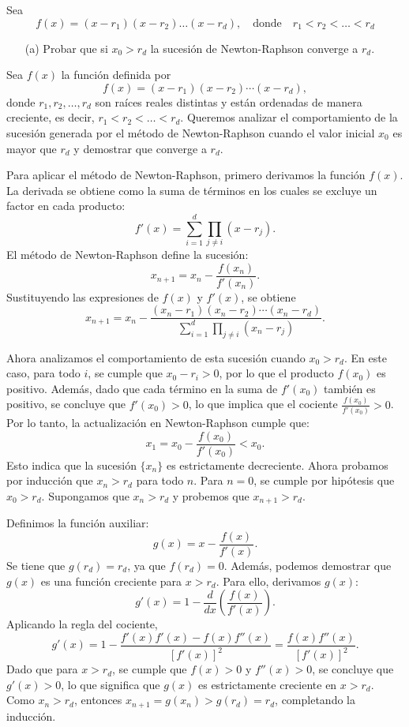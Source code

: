 \begin{homeworkProblem}
  Sea
\[
f(x) = (x - r_1)(x - r_2) \dots (x - r_d),\quad \text{donde} \quad r_1 < r_2 < \dots < r_d
\]
  \begin{solucion}
    \begin{itemize}
      \item[(a)] Probar que si \( x_0 > r_d \) la sucesión de Newton-Raphson converge a \( r_d \).
    \end{itemize}
    Sea \( f(x) \)  la función definida por
\[
f(x) = (x - r_1)(x - r_2) \cdots (x - r_d),
\]
    donde \( r_1, r_2, \dots, r_d \) son raíces reales distintas y están ordenadas de manera creciente, es decir, \( r_1 < r_2 < \dots < r_d \). Queremos analizar el comportamiento de la sucesión generada por el método de Newton-Raphson cuando el valor inicial \( x_0 \) es mayor que \( r_d \) y demostrar que converge a \( r_d \).

    Para aplicar el método de Newton-Raphson, primero derivamos la función \( f(x) \). La derivada se obtiene como la suma de términos en los cuales se excluye un factor en cada producto:
\[
f'(x) = \sum_{i=1}^{d} \prod_{j \neq i} (x - r_j).
\]
    El método de Newton-Raphson define la sucesión:
\[
x_{n+1} = x_n - \frac{f(x_n)}{f'(x_n)}.
\]
    Sustituyendo las expresiones de \( f(x) \) y \( f'(x) \), se obtiene
\[
x_{n+1} = x_n - \frac{(x_n - r_1)(x_n - r_2) \cdots (x_n - r_d)}{\sum_{i=1}^{d} \prod_{j \neq i} (x_n - r_j)}.
\]

    Ahora analizamos el comportamiento de esta sucesión cuando \( x_0 > r_d \). En este caso, para todo \( i \), se cumple que \( x_0 - r_i > 0 \), por lo que el producto \( f(x_0) \) es positivo. Además, dado que cada término en la suma de \( f'(x_0) \) también es positivo, se concluye que \( f'(x_0) > 0 \), lo que implica que el cociente \( \frac{f(x_0)}{f'(x_0)} > 0 \). Por lo tanto, la actualización en Newton-Raphson cumple que:
\[
x_1 = x_0 - \frac{f(x_0)}{f'(x_0)} < x_0.
\]
    Esto indica que la sucesión \( \{x_n\} \) es estrictamente decreciente. Ahora probamos por inducción que \( x_n > r_d \) para todo \( n \). Para \( n = 0 \), se cumple por hipótesis que \( x_0 > r_d \). Supongamos que \( x_n > r_d \) y probemos que \( x_{n+1} > r_d \).

    Definimos la función auxiliar:
\[
g(x) = x - \frac{f(x)}{f'(x)}.
\]
    Se tiene que \( g(r_d) = r_d \), ya que \( f(r_d) = 0 \). Además, podemos demostrar que \( g(x) \) es una función creciente para \( x > r_d \). Para ello, derivamos \( g(x) \):
\[
g'(x) = 1 - \frac{d}{dx} \left( \frac{f(x)}{f'(x)} \right).
\]
    Aplicando la regla del cociente,
\[
g'(x) = 1 - \frac{f'(x) f'(x) - f(x) f''(x)}{[f'(x)]^2} = \frac{f(x) f''(x)}{[f'(x)]^2}.
\]
    Dado que para \( x > r_d \), se cumple que \( f(x) > 0 \) y \( f''(x) > 0 \), se concluye que \( g'(x) > 0 \), lo que significa que \( g(x) \) es estrictamente creciente en \( x > r_d \). Como \( x_n > r_d \), entonces \( x_{n+1} = g(x_n) > g(r_d) = r_d \), completando la inducción.


\end{solucion}
\end{homeworkProblem}
